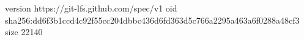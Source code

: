 version https://git-lfs.github.com/spec/v1
oid sha256:dd6f3b1ccd4c92f55cc204dbbc436d6fd363d5c766a2295a463a6f0288a48cf3
size 22140
